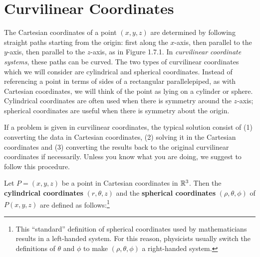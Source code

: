 \newpage
\section{Curvilinear Coordinates}
\piccaption[]{}
The Cartesian coordinates of a point $(x,y,z)$ are determined by following straight paths starting from the origin: 
first along the $x$-axis, then parallel to the $y$-axis, then parallel to the $z$-axis, as in
Figure 1.7.1. In \emph{curvilinear coordinate systems}, these paths can be curved.
The two types of curvilinear coordinates which we will consider are cylindrical and
spherical coordinates.
Instead of referencing a point in terms of sides of a rectangular parallelepiped, as with Cartesian coordinates, we will
think of the point as lying on a cylinder or sphere.
Cylindrical coordinates are often used when there is symmetry around the $z$-axis; 
spherical coordinates are useful when there is symmetry about the origin.

If a problem is given in curvilinear coordinates, 
the typical solution consist of (1) converting the data in Cartesian coordinates, (2) solving it in the Cartesian coordinates and (3) converting the results back to the original curvilinear coordinates if necessarily.
Unless you know what you are doing, we suggest to follow this procedure.

Let $P = (x,y,z)$ be
a point in Cartesian coordinates in $\mathbb{R}^{3}$.
Then the
\textbf{cylindrical coordinates} $(r,\theta,z)$  and the \textbf{spherical coordinates} $ (\rho,\theta,\phi)$ of
$P(x,y,z)$ are defined as follows:\footnote{This ``standard'' definition of
spherical coordinates used by mathematicians results in a
left-handed system. 
For this reason, physicists usually switch the definitions
of $\theta$ and $\phi$ to make $(\rho,\theta,\phi)$ a right-handed system.}\smallskip


